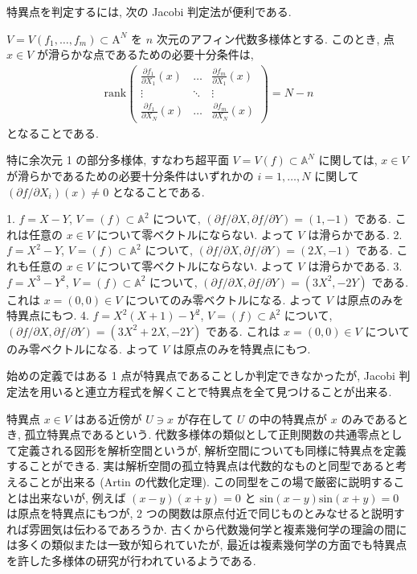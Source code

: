 \documentclass[openany, a4paper, oneside]{jsbook}
\begin{document}
特異点を判定するには, 次の Jacobi 判定法が便利である.
\begin{prop}
 $V = V (f_1,\dots,f_m) \subset \mathrm{A}^N$ を $n$ 次元のアフィン代数多様体とする.
 このとき, 点 $x \in V$ が滑らかな点であるための必要十分条件は,
 \begin{align}
  \mathrm{rank} \left(
  \begin{array}{ccc}
   \frac{\partial f_1}{\partial X_1}(x) & \ldots &  \frac{\partial f_m}{\partial X_1}(x) \\
   \vdots & \ddots & \vdots \\
   \frac{\partial f_1}{\partial X_N}(x) & \ldots & \frac{\partial f_m}{\partial X_N}(x)
  \end{array}
  \right)
  =
  N -n
 \end{align}
 となることである. \fin
\end{prop}

特に余次元 1 の部分多様体, すなわち超平面 $V=V (f) \subset \mathbb{A}^N$ に関しては,
$x \in V$ が滑らかであるための必要十分条件はいずれかの $i=1, \dots, N$ に関して $(\partial f / \partial X_i) (x) \neq 0$ となることである.
\begin{ex}
1. $f=X-Y$, $V=(f) \subset \mathbb{A}^2$ について,
   $(\partial f/\partial X, \partial f/\partial Y) = (1, -1)$ である.
   これは任意の $x \in V$ について零ベクトルにならない.
   よって $V$ は滑らかである.
2. $f=X^2-Y$, $V=(f) \subset \mathbb{A}^2$ について, $(\partial f/\partial X, \partial f/\partial Y) = (2X , -1)$ である.
   これも任意の $x \in V$ について零ベクトルにならない.
   よって $V$ は滑らかである.
3. $f=X^3-Y^2$, $V=(f) \subset \mathbb{A}^2$ について,
   $(\partial f/\partial X, \partial f/\partial Y) = (3X^2 , -2Y)$ である.
   これは $x = (0,0)  \in V$ についてのみ零ベクトルになる.
   よって $V$ は原点のみを特異点にもつ.
4. $f=X^2 (X+1)-Y^2$, $V=(f) \subset \mathbb{A}^2$ について,
   $(\partial f / \partial X, \partial f/\partial Y) = (3X^2+2X , -2Y)$ である.
   これは $x = (0,0) \in V$ についてのみ零ベクトルになる.
   よって $V$ は原点のみを特異点にもつ. \fin
\end{ex}

始めの定義ではある 1 点が特異点であることしか判定できなかったが,
Jacobi 判定法を用いると連立方程式を解くことで特異点を全て見つけることが出来る.
\begin{rem}
特異点 $x \in V$ はある近傍が $U \ni x$ が存在して $U$ の中の特異点が $x$ のみであるとき, 孤立特異点であるという.
代数多様体の類似として正則関数の共通零点として定義される図形を解析空間というが,
解析空間についても同様に特異点を定義することができる.
実は解析空間の孤立特異点は代数的なものと同型であると考えることが出来る (Artin の代数化定理).
この同型をこの場で厳密に説明することは出来ないが,
例えば $(x-y) (x+y)=0$ と $\mathrm{sin}(x-y)\mathrm{sin}(x+y)=0$ は原点を特異点にもつが,
2 つの関数は原点付近で同じものとみなせると説明すれば雰囲気は伝わるであろうか.
古くから代数幾何学と複素幾何学の理論の間には多くの類似または一致が知られていたが,
最近は複素幾何学の方面でも特異点を許した多様体の研究が行われているようである. \fin
\end{rem}
\end{document}
